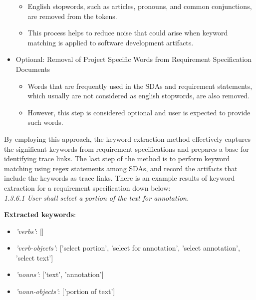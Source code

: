 \documentclass[conference]{IEEEtran}
\begin{document}
\begin{itemize}
        \begin{itemize}
            \item English stopwords, such as articles, pronouns, and common conjunctions, are removed from the tokens.
            \item This process helps to reduce noise that could arise when keyword matching is applied to software development artifacts.
        \end{itemize}
    \item Optional: Removal of Project Specific Words from Requirement Specification Documents
        \begin{itemize}
            \item Words that are frequently used in the SDAs and requirement statements, which usually are not considered as english stopwords, are also removed.
            \item However, this step is considered optional and user is expected to provide such words.
        \end{itemize}
\end{itemize}

By employing this approach, the keyword extraction method effectively captures the significant keywords from requirement specifications and prepares a base for identifying trace links. The last step of the method is to perform keyword matching using regex statements among SDAs, and record the artifacts that include the keywords as trace links. There is an example results of keyword extraction for a requirement specification down below:\\

\textit{1.3.6.1 User shall select a portion of the text for annotation.}

\textbf{Extracted keywords}: 
\begin{itemize}
    \item \textit{'verbs'}: []
    \item \textit{'verb-objects'}: ['select portion', 'select for annotation', 'select annotation', 'select text']
    \item \textit{'nouns'}: ['text', 'annotation']
    \item  \textit{'noun-objects'}: ['portion of text']\\
\end{itemize}
\end{document}
